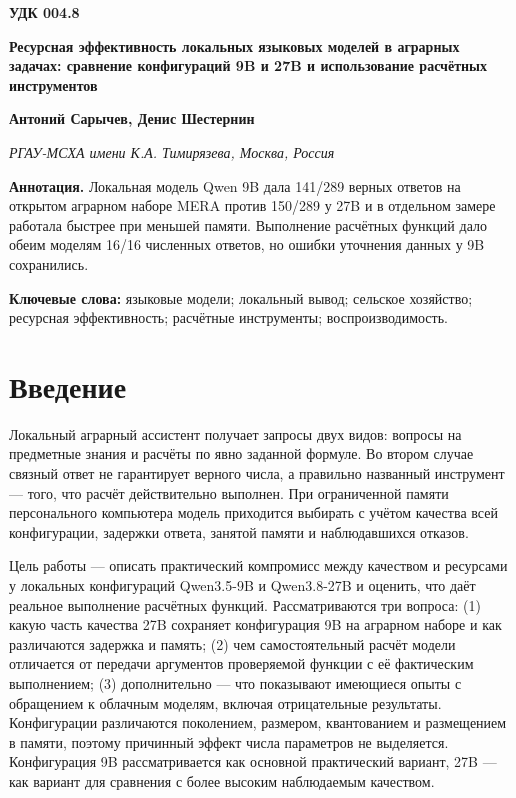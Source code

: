 \documentclass[14pt,a4paper]{extarticle}
\begin{document}
\noindent\textbf{УДК 004.8}\par\medskip
\begin{center}\bfseries\large Ресурсная эффективность локальных языковых моделей в аграрных задачах: сравнение конфигураций 9B и 27B и использование расчётных инструментов\end{center}
\begin{center}\textbf{Антоний Сарычев, Денис Шестернин}\end{center}
\begin{center}\textit{РГАУ-МСХА имени К.А. Тимирязева, Москва, Россия}\end{center}
{\noindent\fontsize{12}{14}\selectfont \textbf{Аннотация.} Локальная модель Qwen 9B дала 141/289 верных ответов на открытом аграрном наборе MERA против 150/289 у 27B и в отдельном замере работала быстрее при меньшей памяти. Выполнение расчётных функций дало обеим моделям 16/16 численных ответов, но ошибки уточнения данных у 9B сохранились.\par}\smallskip
{\noindent\fontsize{12}{14}\selectfont \textbf{Ключевые слова:} языковые модели; локальный вывод; сельское хозяйство; ресурсная эффективность; расчётные инструменты; воспроизводимость.\par}\smallskip
\section*{Введение}
Локальный аграрный ассистент получает запросы двух видов: вопросы на предметные знания и расчёты по явно заданной формуле. Во втором случае связный ответ не гарантирует верного числа, а правильно названный инструмент — того, что расчёт действительно выполнен. При ограниченной памяти персонального компьютера модель приходится выбирать с учётом качества всей конфигурации, задержки ответа, занятой памяти и наблюдавшихся отказов.

Цель работы — описать практический компромисс между качеством и ресурсами у локальных конфигураций Qwen3.5-9B и Qwen3.8-27B и оценить, что даёт реальное выполнение расчётных функций. Рассматриваются три вопроса: (1) какую часть качества 27B сохраняет конфигурация 9B на аграрном наборе и как различаются задержка и память; (2) чем самостоятельный расчёт модели отличается от передачи аргументов проверяемой функции с её фактическим выполнением; (3) дополнительно — что показывают имеющиеся опыты с обращением к облачным моделям, включая отрицательные результаты. Конфигурации различаются поколением, размером, квантованием и размещением в памяти, поэтому причинный эффект числа параметров не выделяется. Конфигурация 9B рассматривается как основной практический вариант, 27B — как вариант для сравнения с более высоким наблюдаемым качеством.
\end{document}
